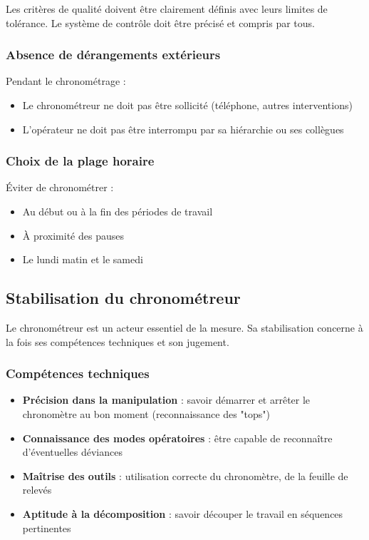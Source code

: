 \documentclass[a4paper,12pt]{article}
\begin{document}
Les critères de qualité doivent être clairement définis avec leurs limites de tolérance. Le système de contrôle doit être précisé et compris par tous.

\subsubsection{Absence de dérangements extérieurs}

Pendant le chronométrage :
\begin{itemize}
    \item Le chronométreur ne doit pas être sollicité (téléphone, autres interventions)
    \item L'opérateur ne doit pas être interrompu par sa hiérarchie ou ses collègues
\end{itemize}

\subsubsection{Choix de la plage horaire}

Éviter de chronométrer :
\begin{itemize}
    \item Au début ou à la fin des périodes de travail
    \item À proximité des pauses
    \item Le lundi matin et le samedi
\end{itemize}

\subsection{Stabilisation du chronométreur}

Le chronométreur est un acteur essentiel de la mesure. Sa stabilisation concerne à la fois ses compétences techniques et son jugement.

\subsubsection{Compétences techniques}

\begin{itemize}
    \item \textbf{Précision dans la manipulation} : savoir démarrer et arrêter le chronomètre au bon moment (reconnaissance des "tops")
    \item \textbf{Connaissance des modes opératoires} : être capable de reconnaître d'éventuelles déviances
    \item \textbf{Maîtrise des outils} : utilisation correcte du chronomètre, de la feuille de relevés
    \item \textbf{Aptitude à la décomposition} : savoir découper le travail en séquences pertinentes
\end{itemize}
\end{document}
